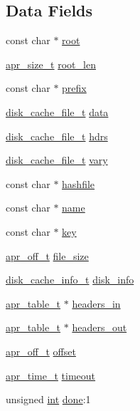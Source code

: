 \subsection*{Data Fields}
\begin{DoxyCompactItemize}
\item 
const char $\ast$ \hyperlink{structdisk__cache__object_ad32a3f46163c737233928143e065ba3a}{root}
\item 
\hyperlink{group__apr__platform_gaaa72b2253f6f3032cefea5712a27540e}{apr\+\_\+size\+\_\+t} \hyperlink{structdisk__cache__object_aeb3f73b523c57e2bbe15aea5980461f4}{root\+\_\+len}
\item 
const char $\ast$ \hyperlink{structdisk__cache__object_af981fd88139146a3aa86893e56ac94c7}{prefix}
\item 
\hyperlink{structdisk__cache__file__t}{disk\+\_\+cache\+\_\+file\+\_\+t} \hyperlink{structdisk__cache__object_a33ccbf8df2be6a5650aaa6087b20d7c7}{data}
\item 
\hyperlink{structdisk__cache__file__t}{disk\+\_\+cache\+\_\+file\+\_\+t} \hyperlink{structdisk__cache__object_a1331c4c148787a14633e615127ed718f}{hdrs}
\item 
\hyperlink{structdisk__cache__file__t}{disk\+\_\+cache\+\_\+file\+\_\+t} \hyperlink{structdisk__cache__object_a65af1db919a11b480574e7b330e46987}{vary}
\item 
const char $\ast$ \hyperlink{structdisk__cache__object_a107e17e1e453406955861524d6167fbe}{hashfile}
\item 
const char $\ast$ \hyperlink{structdisk__cache__object_a773ed3fb36e3abe84f20fc90f0b20f8e}{name}
\item 
const char $\ast$ \hyperlink{structdisk__cache__object_aa78f71019e074c8006226862e3cef0c2}{key}
\item 
\hyperlink{group__apr__platform_ga6938af9075cec15c88299109381aa984}{apr\+\_\+off\+\_\+t} \hyperlink{structdisk__cache__object_a5d8813167fedda1095bde53c39c02fc5}{file\+\_\+size}
\item 
\hyperlink{structdisk__cache__info__t}{disk\+\_\+cache\+\_\+info\+\_\+t} \hyperlink{structdisk__cache__object_aa6443e2ba434c2ffb77b786cb5729817}{disk\+\_\+info}
\item 
\hyperlink{structapr__table__t}{apr\+\_\+table\+\_\+t} $\ast$ \hyperlink{structdisk__cache__object_a55d3439b450df0695132023aa3fc9354}{headers\+\_\+in}
\item 
\hyperlink{structapr__table__t}{apr\+\_\+table\+\_\+t} $\ast$ \hyperlink{structdisk__cache__object_a496317648fbd3ba4c3360e942bed9a3b}{headers\+\_\+out}
\item 
\hyperlink{group__apr__platform_ga6938af9075cec15c88299109381aa984}{apr\+\_\+off\+\_\+t} \hyperlink{structdisk__cache__object_ac9d5953c7961e0387561d09eb88e847c}{offset}
\item 
\hyperlink{group__apr__time_gadb4bde16055748190eae190c55aa02bb}{apr\+\_\+time\+\_\+t} \hyperlink{structdisk__cache__object_ae4a6a177068c910c9af3eebd66fbbb2c}{timeout}
\item 
unsigned \hyperlink{pcre_8txt_a42dfa4ff673c82d8efe7144098fbc198}{int} \hyperlink{structdisk__cache__object_ade2634d68e33dcaf8e15c022d194aa35}{done}\+:1
\end{DoxyCompactItemize}


